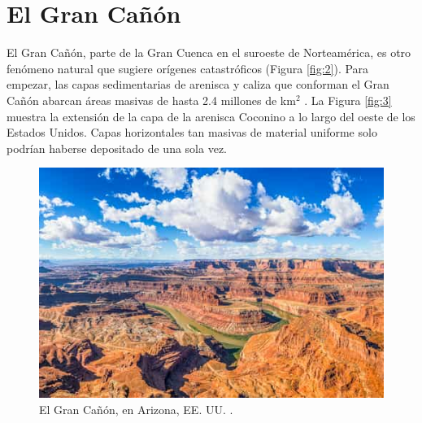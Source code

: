\documentclass[10pt,twocolumn,letterpaper]{article}
\begin{document}
\section{El Gran Cañón}

El Gran Cañón, parte de la Gran Cuenca en el suroeste de Norteamérica, es otro fenómeno natural que sugiere orígenes catastróficos (Figura \ref{fig:2}). Para empezar, las capas sedimentarias de arenisca y caliza que conforman el Gran Cañón abarcan áreas masivas de hasta 2.4 millones de km$^2$ \cite{21}. La Figura \ref{fig:3} muestra la extensión de la capa de la arenisca Coconino a lo largo del oeste de los Estados Unidos. Capas horizontales tan masivas de material uniforme solo podrían haberse depositado de una sola vez.

\begin{figure}[t]
\begin{center}
   \includegraphics[width=1\linewidth]{grand-canyon.jpg}
\end{center}
   \caption{El Gran Cañón, en Arizona, EE. UU. \cite{49}.}
\label{fig:2}
\label{fig:onecol}
\end{figure}
\end{document}
